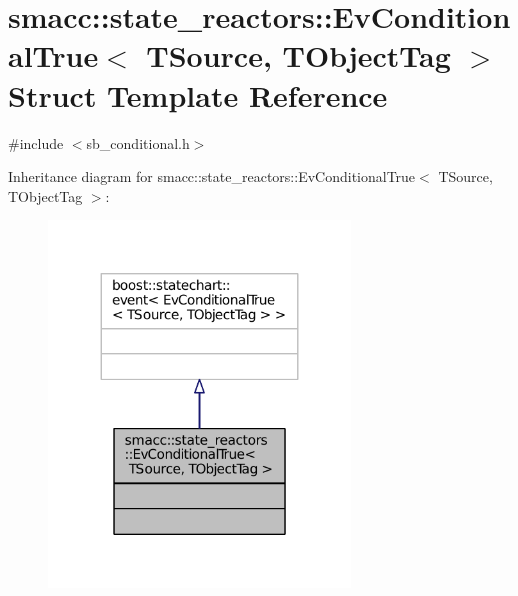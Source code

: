\hypertarget{structsmacc_1_1state__reactors_1_1EvConditionalTrue}{}\section{smacc\+:\+:state\+\_\+reactors\+:\+:Ev\+Conditional\+True$<$ T\+Source, T\+Object\+Tag $>$ Struct Template Reference}
\label{structsmacc_1_1state__reactors_1_1EvConditionalTrue}


{\ttfamily \#include $<$sb\+\_\+conditional.\+h$>$}



Inheritance diagram for smacc\+:\+:state\+\_\+reactors\+:\+:Ev\+Conditional\+True$<$ T\+Source, T\+Object\+Tag $>$\+:
\nopagebreak
\begin{figure}[H]
\begin{center}
\leavevmode
\includegraphics[width=227pt]{structsmacc_1_1state__reactors_1_1EvConditionalTrue__inherit__graph}
\end{center}
\end{figure}


